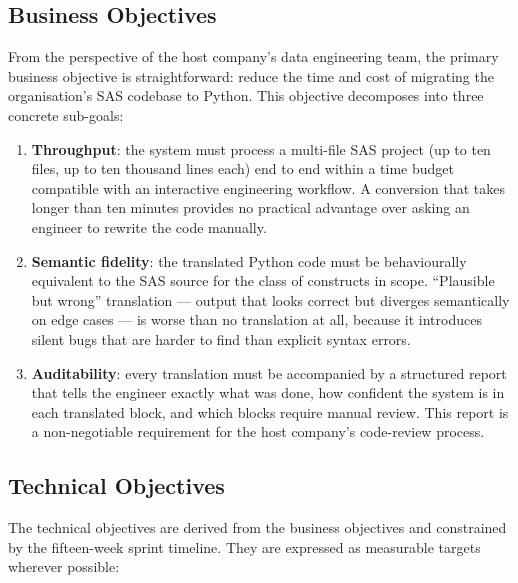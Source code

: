 \subsection{Business Objectives}
\label{subsec:business-objectives}

From the perspective of the host company's data engineering team, the primary
business objective is straightforward: reduce the time and cost of migrating
the organisation's SAS codebase to Python. This objective decomposes into three
concrete sub-goals:

\begin{enumerate}
  \item \textbf{Throughput}: the system must process a multi-file SAS project
    (up to ten files, up to ten thousand lines each) end to end within a
    time budget compatible with an interactive engineering workflow. A
    conversion that takes longer than ten minutes provides no practical
    advantage over asking an engineer to rewrite the code manually.

  \item \textbf{Semantic fidelity}: the translated Python code must be
    behaviourally equivalent to the SAS source for the class of constructs
    in scope. ``Plausible but wrong'' translation --- output that looks correct
    but diverges semantically on edge cases --- is worse than no translation at
    all, because it introduces silent bugs that are harder to find than explicit
    syntax errors.

  \item \textbf{Auditability}: every translation must be accompanied by a
    structured report that tells the engineer exactly what was done, how
    confident the system is in each translated block, and which blocks require
    manual review. This report is a non-negotiable requirement for the host
    company's code-review process.
\end{enumerate}

\subsection{Technical Objectives}
\label{subsec:technical-objectives}

The technical objectives are derived from the business objectives and constrained
by the fifteen-week sprint timeline. They are expressed as measurable targets
wherever possible:

